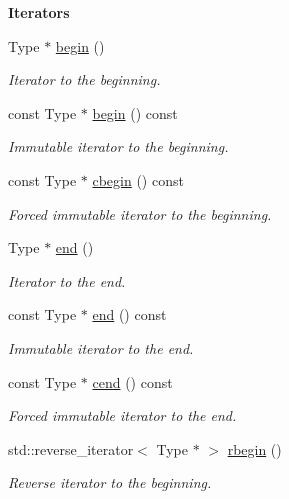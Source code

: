 \begin{Indent}{\bf Iterators}\par
\begin{DoxyCompactItemize}
\item 
Type $\ast$ \hyperlink{exceptionmagrathea_1_1Evolution_a92cc5477dadd6aedc1f3c66ef365c1fc}{begin} ()
\begin{DoxyCompactList}\small\item\em Iterator to the beginning. \end{DoxyCompactList}\item 
const Type $\ast$ \hyperlink{exceptionmagrathea_1_1Evolution_a0af2e87ea5d7ed075c40d6364ca6d94b}{begin} () const 
\begin{DoxyCompactList}\small\item\em Immutable iterator to the beginning. \end{DoxyCompactList}\item 
const Type $\ast$ \hyperlink{exceptionmagrathea_1_1Evolution_a42eba2a0e8a1eeb21a0ca575302b24d1}{cbegin} () const 
\begin{DoxyCompactList}\small\item\em Forced immutable iterator to the beginning. \end{DoxyCompactList}\item 
Type $\ast$ \hyperlink{exceptionmagrathea_1_1Evolution_a1e9540dd930884350270a119a954b193}{end} ()
\begin{DoxyCompactList}\small\item\em Iterator to the end. \end{DoxyCompactList}\item 
const Type $\ast$ \hyperlink{exceptionmagrathea_1_1Evolution_a56bcbda12ede80221cc44c485654c8c8}{end} () const 
\begin{DoxyCompactList}\small\item\em Immutable iterator to the end. \end{DoxyCompactList}\item 
const Type $\ast$ \hyperlink{exceptionmagrathea_1_1Evolution_aec669868c6c5fcd0a59391b0df16b634}{cend} () const 
\begin{DoxyCompactList}\small\item\em Forced immutable iterator to the end. \end{DoxyCompactList}\item 
std\-::reverse\-\_\-iterator$<$ Type $\ast$ $>$ \hyperlink{exceptionmagrathea_1_1Evolution_ad358e12921812a2ca40101540a02923d}{rbegin} ()
\begin{DoxyCompactList}\small\item\em Reverse iterator to the beginning. \end{DoxyCompactList}\item 

\end{DoxyCompactItemize}
\end{Indent}
